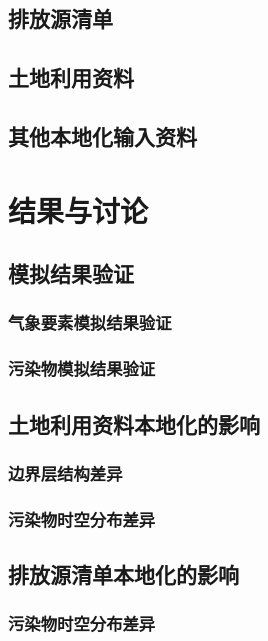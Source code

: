 \documentclass[a4paper]{article}
\begin{document}
\subsection{排放源清单}
\subsection{土地利用资料}
\subsection{其他本地化输入资料}
\section{结果与讨论}
\subsection{模拟结果验证}
\subsubsection{气象要素模拟结果验证}
\subsubsection{污染物模拟结果验证}
\subsection{土地利用资料本地化的影响}
\subsubsection{边界层结构差异}
\subsubsection{污染物时空分布差异}
\subsection{排放源清单本地化的影响}
\subsubsection{污染物时空分布差异}
\end{document}
